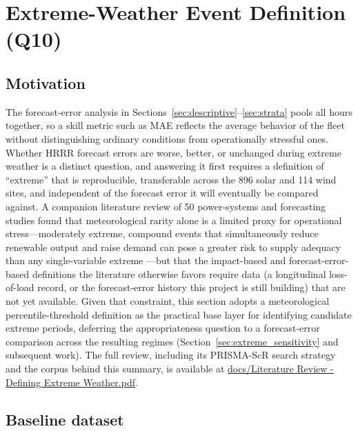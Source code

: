 \section{Extreme-Weather Event Definition (Q10)}\label{sec:extreme_def}

\subsection{Motivation}

The forecast-error analysis in Sections~\ref{sec:descriptive}--\ref{sec:strata} pools all hours
together, so a skill metric such as MAE reflects the average behavior of the fleet without
distinguishing ordinary conditions from operationally stressful ones. Whether HRRR forecast errors
are worse, better, or unchanged during extreme weather is a distinct question, and answering it
first requires a definition of ``extreme'' that is reproducible, transferable across the
\num{896} solar and \num{114} wind sites, and independent of the forecast error it will eventually
be compared against. A companion literature review of 50 power-systems and forecasting studies
\citep{murong2026litreview} found that meteorological rarity alone is a limited proxy for
operational stress---moderately extreme, compound events that simultaneously reduce renewable
output and raise demand can pose a greater risk to supply adequacy than any single-variable
extreme \citep{chen2026}---but that the impact-based and forecast-error-based definitions the
literature otherwise favors require data (a longitudinal loss-of-load record, or the
forecast-error history this project is still building) that are not yet available. Given that
constraint, this section adopts a meteorological percentile-threshold definition as the practical
base layer for identifying candidate extreme periods, deferring the appropriateness question to a
forecast-error comparison across the resulting regimes (Section~\ref{sec:extreme_sensitivity} and
subsequent work). The full review, including its PRISMA-ScR search strategy and the corpus behind
this summary, is available at \url{docs/Literature Review - Defining Extreme Weather.pdf}.

\subsection{Baseline dataset}

